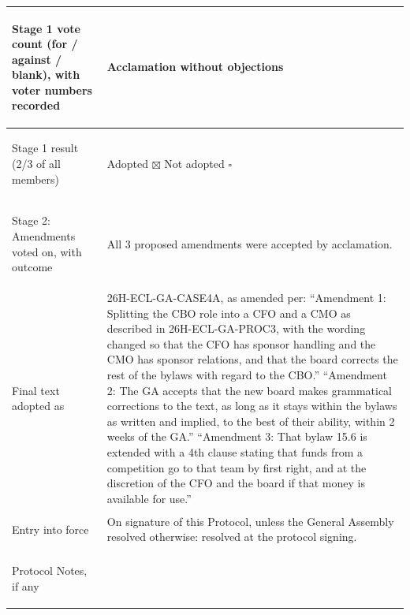 \documentclass{../../Common/Latex/Templates/rapport}
\begin{document}
\begin{tabularx}{\textwidth}{|>{\bfseries\raggedright\arraybackslash}p{5cm}|X|}
  \hline
  Stage 1 vote count (for / against / blank), with voter numbers recorded & \rule{0pt}{0.9cm}Acclamation without objections                                                                                               \\
  \hline
  Stage 1 result (2/3 of all members)                                     & \rule{0pt}{0.9cm}Adopted \quad $\boxtimes$ \quad\quad Not adopted \quad $\square$                                                             \\
  \hline
  Stage 2: Amendments voted on, with outcome                              & \rule{0pt}{1.8cm}All 3 proposed amendments were accepted by acclamation.                                                                      \\
  \hline
  Final text adopted as                                                   & \rule{0pt}{0.9cm}26H-ECL-GA-CASE4A, as amended per:
  ``Amendment 1: Splitting the CBO role into a CFO and a CMO as described in 26H-ECL-GA-PROC3, with the wording changed so that the CFO has sponsor handling and the CMO has sponsor relations, and that the board corrects the rest of the bylaws with regard to the CBO.''
  ``Amendment 2: The GA accepts that the new board makes grammatical corrections to the text, as long as it stays within the bylaws as written and implied, to the best of their ability, within 2 weeks of the GA.''
  ``Amendment 3: That bylaw 15.6 is extended with a 4th clause stating that funds from a competition go to that team by first right, and at the discretion of the CFO and the board if that money is available for use.'' \\
  \hline
  Entry into force                                                        & \rule{0pt}{0.9cm}On signature of this Protocol, unless the General Assembly resolved otherwise: resolved at the protocol signing.             \\
  \hline
  Protocol Notes, if any                                                  & \rule{0pt}{1.2cm}                                                                                                                             \\
  \hline
\end{tabularx}
\end{document}
